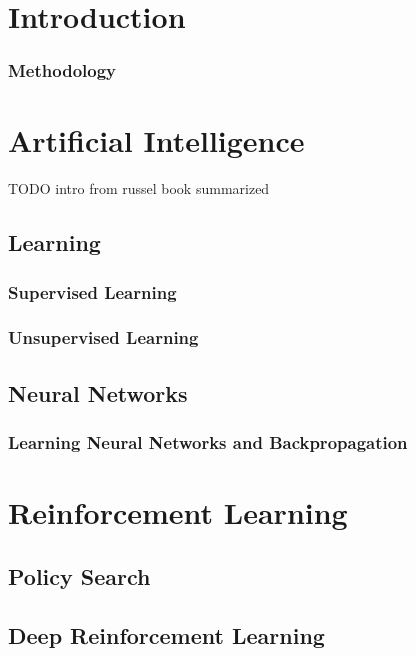\chapter{Introduction}

\subsection{Methodology}


\chapter{Artificial Intelligence}

 TODO intro from russel book summarized 
\section{Learning}

\subsection{Supervised Learning}

\subsection{Unsupervised Learning}

\section{Neural Networks}%
\label{sec:neural_networks}

\subsection{Learning Neural Networks and Backpropagation}
\label{sec:Backpropagation}


\chapter{Reinforcement Learning}
\section{Policy Search}
\section{Deep Reinforcement Learning}

